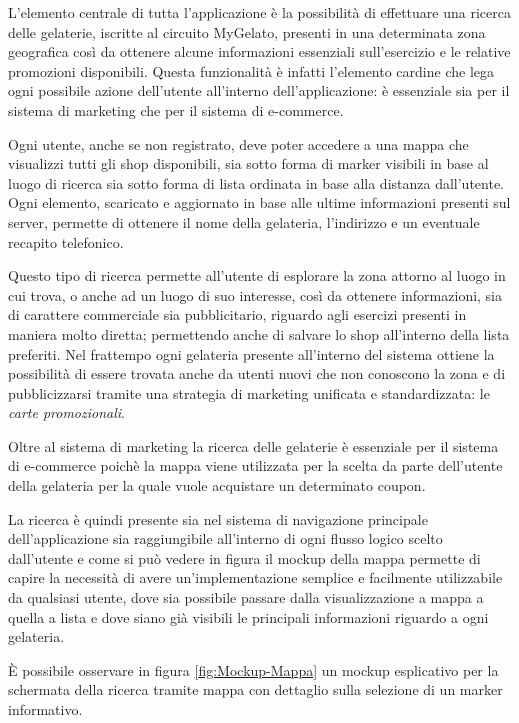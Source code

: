L'elemento centrale di tutta l'applicazione è la possibilità di effettuare
una ricerca delle gelaterie, iscritte al circuito MyGelato, presenti
in una determinata zona geografica così da ottenere alcune informazioni
essenziali sull'esercizio e le relative promozioni disponibili. Questa
funzionalità è infatti l'elemento cardine che lega ogni possibile
azione dell'utente all'interno dell'applicazione: è essenziale sia
per il sistema di marketing che per il sistema di e-commerce.\bigskip{}

Ogni utente, anche se non registrato, deve poter accedere a una mappa
che visualizzi tutti gli shop disponibili, sia sotto forma di marker
visibili in base al luogo di ricerca sia sotto forma di lista ordinata
in base alla distanza dall'utente. Ogni elemento, scaricato e aggiornato
in base alle ultime informazioni presenti sul server, permette di
ottenere il nome della gelateria, l'indirizzo e un eventuale recapito
telefonico.

Questo tipo di ricerca permette all'utente di esplorare la zona attorno
al luogo in cui trova, o anche ad un luogo di suo interesse, così
da ottenere informazioni, sia di carattere commerciale sia pubblicitario,
riguardo agli esercizi presenti in maniera molto diretta; permettendo
anche di salvare lo shop all'interno della lista preferiti. Nel frattempo
ogni gelateria presente all'interno del sistema ottiene la possibilità
di essere trovata anche da utenti nuovi che non conoscono la zona
e di pubblicizzarsi tramite una strategia di marketing unificata e
standardizzata: le \emph{carte promozionali}.\bigskip{}

Oltre al sistema di marketing la ricerca delle gelaterie è essenziale
per il sistema di e-commerce poichè la mappa viene utilizzata per
la scelta da parte dell'utente della gelateria per la quale vuole
acquistare un determinato coupon. \smallskip{}

La ricerca è quindi presente sia nel sistema di navigazione principale
dell'applicazione sia raggiungibile all'interno di ogni flusso logico
scelto dall'utente e come si può vedere in figura il mockup della
mappa permette di capire la necessità di avere un'implementazione
semplice e facilmente utilizzabile da qualsiasi utente, dove sia possibile
passare dalla visualizzazione a mappa a quella a lista e dove siano
già visibili le principali informazioni riguardo a ogni gelateria.

È possibile osservare in figura \ref{fig:Mockup-Mappa} un mockup
esplicativo per la schermata della ricerca tramite mappa con dettaglio
sulla selezione di un marker informativo.\bigskip{}

